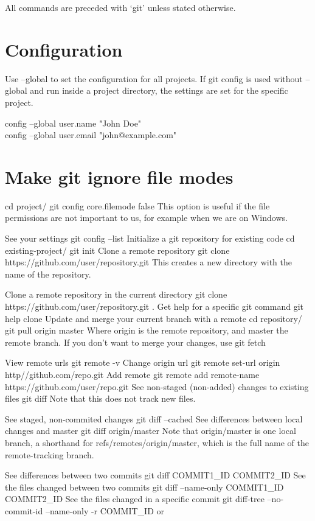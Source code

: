 \documentclass{article}
\begin{document}
All commands are preceded with `git' unless stated otherwise.

\section{Configuration}
Use --global to set the configuration for all projects.  If git config is used
without --global and run inside a project directory, the settings are
set for the specific project.
\begin{description}
    \item [config --global user.name "John Doe"]
    \item [config --global user.email "john@example.com"]
\end{description}

\section{Make git ignore file modes}
cd project/
git config core.filemode false
This option is useful if the file permissions are not important to us, for
example when we are on Windows.

See your settings
git config --list
Initialize a git repository for existing code
cd existing-project/
git init
Clone a remote repository
git clone https://github.com/user/repository.git
This creates a new directory with the name of the repository.

Clone a remote repository in the current directory
git clone https://github.com/user/repository.git .
Get help for a specific git command
git help clone
Update and merge your current branch with a remote
cd repository/
git pull origin master
Where origin is the remote repository, and master the remote branch.
If you don't want to merge your changes, use git fetch

View remote urls
git remote -v
Change origin url
git remote set-url origin http//github.com/repo.git
Add remote
git remote add remote-name https://github.com/user/repo.git
See non-staged (non-added) changes to existing files
git diff
Note that this does not track new files.

See staged, non-commited changes
git diff --cached
See differences between local changes and master
git diff origin/master
Note that origin/master is one local branch, a shorthand for refs/remotes/origin/master, which is the full name of the remote-tracking branch.

See differences between two commits
git diff COMMIT1_ID COMMIT2_ID
See the files changed between two commits
git diff --name-only COMMIT1_ID COMMIT2_ID
See the files changed in a specific commit
git diff-tree --no-commit-id --name-only -r COMMIT_ID
or
\end{document}
